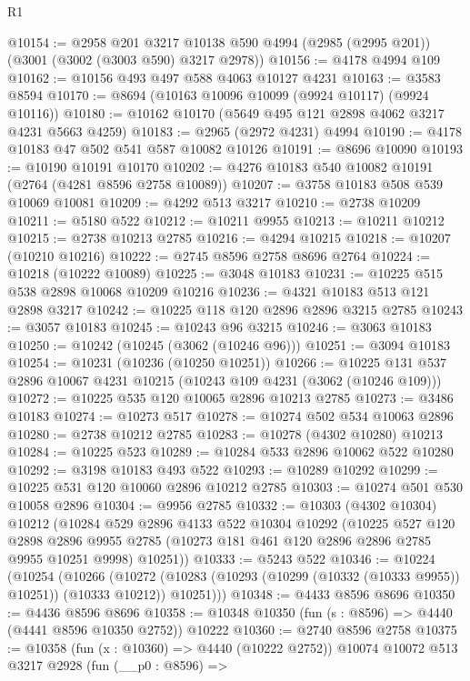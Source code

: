\begin{lexlean}{R1}
\begin{coremodule}
@10154 := @2958
    @201
    @3217
    @10138
    @590
    @4994
    (@2985 (@2995 @201))
    (@3001 (@3002 (@3003 @590) @3217 @2978))
@10156 := @4178 @4994 @109
@10162 := @10156 @493 @497 @588 @4063 @10127 @4231
@10163 := @3583 @8594
@10170 := @8694 (@10163 @10096 @10099 (@9924 @10117) (@9924 @10116))
@10180 := @10162 @10170 (@5649 @495 @121 @2898 @4062 @3217 @4231 @5663 @4259)
@10183 := @2965 (@2972 @4231) @4994
@10190 := @4178 @10183 @47 @502 @541 @587 @10082 @10126
@10191 := @8696 @10090
@10193 := @10190 @10191 @10170
@10202 := @4276 @10183 @540 @10082 @10191 (@2764 (@4281 @8596 @2758 @10089))
@10207 := @3758 @10183 @508 @539 @10069 @10081
@10209 := @4292 @513 @3217
@10210 := @2738 @10209
@10211 := @5180 @522
@10212 := @10211 @9955
@10213 := @10211 @10212
@10215 := @2738 @10213 @2785
@10216 := @4294 @10215
@10218 := @10207 (@10210 @10216)
@10222 := @2745 @8596 @2758 @8696 @2764
@10224 := @10218 (@10222 @10089)
@10225 := @3048 @10183
@10231 := @10225 @515 @538 @2898 @10068 @10209 @10216
@10236 := @4321 @10183 @513 @121 @2898 @3217
@10242 := @10225 @118 @120 @2896 @2896 @3215 @2785
@10243 := @3057 @10183
@10245 := @10243 @96 @3215
@10246 := @3063 @10183
@10250 := @10242 (@10245 (@3062 (@10246 @96)))
@10251 := @3094 @10183
@10254 := @10231 (@10236 (@10250 @10251))
@10266 := @10225 @131 @537 @2896 @10067 @4231 @10215 (@10243 @109 @4231 (@3062 (@10246 @109)))
@10272 := @10225 @535 @120 @10065 @2896 @10213 @2785
@10273 := @3486 @10183
@10274 := @10273 @517
@10278 := @10274 @502 @534 @10063 @2896
@10280 := @2738 @10212 @2785
@10283 := @10278 (@4302 @10280) @10213
@10284 := @10225 @523
@10289 := @10284 @533 @2896 @10062 @522 @10280
@10292 := @3198 @10183 @493 @522
@10293 := @10289 @10292
@10299 := @10225 @531 @120 @10060 @2896 @10212 @2785
@10303 := @10274 @501 @530 @10058 @2896
@10304 := @9956 @2785
@10332 := @10303
    (@4302 @10304)
    @10212
    (@10284
      @529
      @2896
      @4133
      @522
      @10304
      @10292
      (@10225
        @527
        @120
        @2898
        @2896
        @9955
        @2785
        (@10273 @181 @461 @120 @2896 @2896 @2785 @9955 @10251 @9998)
        @10251))
@10333 := @5243 @522
@10346 := @10224
    (@10254
      (@10266
        (@10272 (@10283 (@10293 (@10299 (@10332 (@10333 @9955)) @10251)) (@10333 @10212)) @10251)))
@10348 := @4433 @8596 @8696
@10350 := @4436 @8596 @8696
@10358 := @10348 @10350 (fun (s : @8596) => @4440 (@4441 @8596 @10350 @2752)) @10222
@10360 := @2740 @8596 @2758
@10375 := @10358
    (fun (x : @10360) => @4440 (@10222 @2752))
    @10074
    @10072
    @513
    @3217
    @2928
    (fun (__p0 : @8596) =>

\end{coremodule}
\end{lexlean}

